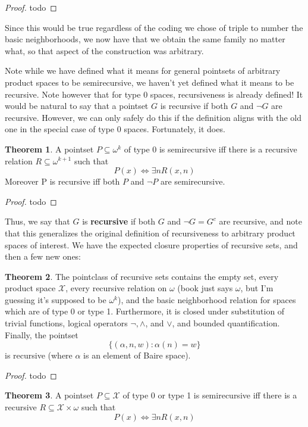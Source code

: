 \documentclass{article}
\theoremstyle{definition}
\newtheorem{theorem}{Theorem}[section]
\theoremstyle{plain}
\begin{document}
\begin{proof}
    todo
\end{proof}
Since this would be true regardless of the coding we chose of triple to number the basic neighborhoods, we now have that we obtain the same family no matter what, so that aspect of the construction was arbitrary. 
\par Note while we have defined what it means for general pointsets of arbitrary product spaces to be semirecursive, we haven't yet defined what it means to be recursive. Note however that for type 0 spaces, recursiveness is already defined! It would be natural to say that a pointset $G$ is recursive if both $G$ and $\neg G$ are recursive. However, we can only safely do this if the definition aligns with the old one in the special case of type 0 spaces. Fortunately, it does.
\begin{theorem}
    A pointset $P \subseteq \omega^k$ of type 0 is semirecursive iff there is a recursive relation $R \subseteq \omega^{k+1}$ such that 
    \[ P(x) \iff \exists n R(x,n) \]
    Moreover P is recursive iff both $P$ and $\neg P$ are semirecursive.
\end{theorem}
\begin{proof}
    todo
\end{proof}
Thus, we say that $G$ is \textbf{recursive} if both $G$ and $\neg G = G^c$ are recursive, and note that this generalizes the original definition of recursiveness to arbitrary product spaces of interest. We have the expected closure properties of recursive sets, and then a few new ones:
\begin{theorem}
    The pointclass of recursive sets contains the empty set, every product space $\mathcal{X}$, every recursive relation on $\omega$ (book just says $\omega$, but I'm guessing it's supposed to be $\omega^k$), and the basic neighborhood relation for spaces which are of type 0 or type 1. Furthermore, it is closed under substitution of trivial functions, logical operators $\neg, \wedge$, and $\vee$, and bounded quantification. Finally, the pointset 
    \[\{(\alpha,n,w): \alpha(n) = w\} \]
    is recursive (where $\alpha$ is an element of Baire space).
\end{theorem}
\begin{proof}
    todo
\end{proof}
\begin{theorem}
    A pointset $P \subseteq \mathcal{X}$ of type 0 or type 1 is semirecursive iff there is a recursive $R \subseteq \mathcal{X} \times \omega$ such that
    \[ P(x) \iff \exists n R(x,n) \]
\end{theorem}
\end{document}
